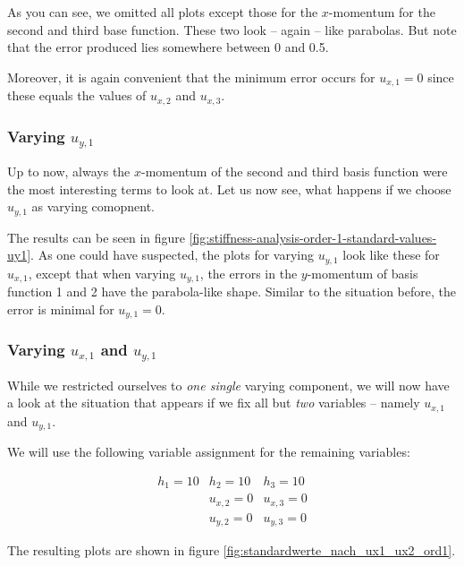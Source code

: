 \documentclass{article}
\begin{document}


As you can see, we omitted all plots except those for the $x$-momentum for the second and third base function. These two look -- again -- like parabolas. But note that the error produced lies somewhere between 0 and 0.5.

Moreover, it is again convenient that the minimum error occurs for $u_{x,1}=0$ since these equals the values of $u_{x,2}$ and $u_{x,3}$.

\subsubsection{Varying $u_{y,1}$}

Up to now, always the $x$-momentum of the second and third basis function were the most interesting terms to look at. Let us now see, what happens if we choose $u_{y,1}$ as varying comopnent.



The results can be seen in figure \ref{fig:stiffness-analysis-order-1-standard-values-uy1}. As one could have suspected, the plots for varying $u_{y,1}$ look like these for $u_{x,1}$, except that when varying $u_{y,1}$, the errors in the $y$-momentum of basis function 1 and 2 have the parabola-like shape. Similar to the situation before, the error is minimal for $u_{y,1}=0$.

\subsubsection{Varying $u_{x,1}$ and $u_{y,1}$}

While we restricted ourselves to \emph{one single} varying component, we will now have a look at the situation that appears if we fix all but \emph{two} variables -- namely $u_{x,1}$ and $u_{y,1}$.

We will use the following variable assignment for the remaining variables:

\begin{eqnarray*}
  h_1 = 10 & h_2 = 10 & h_3 = 10 \\
   & u_{x,2} = 0 & u_{x,3} = 0 \\
   & u_{y,2} = 0 & u_{y,3} = 0
\end{eqnarray*}

The resulting plots are shown in figure \ref{fig:standardwerte_nach_ux1_ux2_ord1}.


\end{document}
